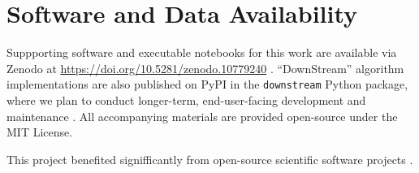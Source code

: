 \section{Software and Data Availability}
\label{sec:materials}

Suppporting software and executable notebooks for this work are available via Zenodo at \url{https://doi.org/10.5281/zenodo.10779240} \citep{moreno2024hsurf}.
``DownStream'' algorithm implementations are also published on PyPI in the \texttt{downstream} Python package, where we plan to conduct longer-term, end-user-facing development and maintenance \citep{moreno2024downstream}.
All accompanying materials are provided open-source under the MIT License.

This project benefited signifficantly from open-source scientific software projects \citep{2020SciPy-NMeth,harris2020array,reback2020pandas,mckinney-proc-scipy-2010,waskom2021seaborn,hunter2007matplotlib,moreno2023teeplot}.
